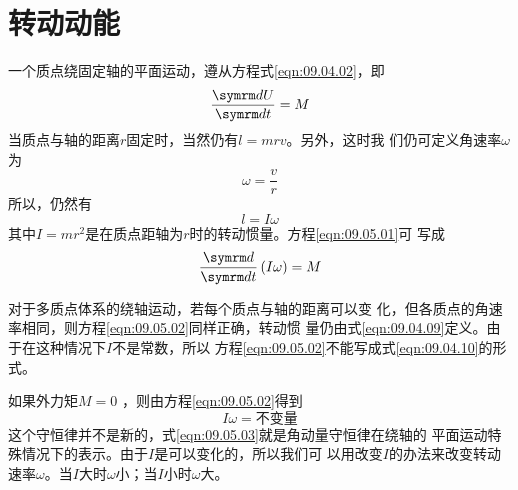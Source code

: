 \section[转动动能]{转\hspace{0.333em}动\hspace{0.333em}动\hspace{0.333em}能}\label{sec:09.05}

一个质点绕固定轴的平面运动，遵从方程式\eqref{eqn:09.04.02}，即
\begin{equation}\label{eqn:09.05.01}
 \frac { \dif U } { \dif t } = M
\end{equation}
当质点与轴的距离$ r $固定时，当然仍有$ l = m r v $。另外，这时我
们仍可定义角速率$ \omega $为
\begin{equation*}
 \omega = \frac { v } { r }
\end{equation*}
所以，仍然有
\begin{equation*}
 l = I \omega
\end{equation*}
其中$ I = m r ^ { 2 } $是在质点距轴为$ r $时的转动惯量。方程\eqref{eqn:09.05.01}可
写成
\begin{equation}\label{eqn:09.05.02}
 \frac { \dif } { \dif t } \left( I \omega \right) = M
\end{equation}

对于多质点体系的绕轴运动，若每个质点与轴的距离可以变
化，但各质点的角速率相同，则方程\eqref{eqn:09.05.02}同样正确，转动惯
量仍由式\eqref{eqn:09.04.09}定义。由于在这种情况下$ I $不是常数，所以
方程\eqref{eqn:09.05.02}不能写成式\eqref{eqn:09.04.10}的形式。

如果外力矩$ M = 0 $ ，则由方程\eqref{eqn:09.05.02}得到
\begin{equation}\label{eqn:09.05.03}
 I \omega = \text{不变量}
\end{equation}
这个守恒律并不是新的，式\eqref{eqn:09.05.03}就是角动量守恒律在绕轴的
平面运动特殊情况下的表示。由于$ I $是可以变化的，所以我们可
以用改变$ I $的办法来改变转动速率$ \omega $。当$ I $大时$ \omega $小；当$ I $小时$ \omega $大。

